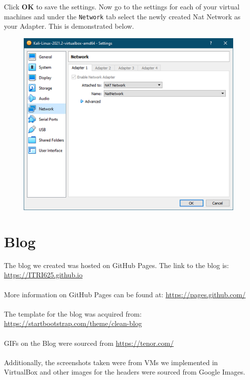 \documentclass[a4paper, 12pt, titlepage]{report}
\begin{document}
Click \textbf{OK} to save the settings. Now go to the settings for each of your virtual machines and under the \texttt{Network} tab select the newly created Nat Network as your Adapter. This is demonstrated below.
\begin{figure}[H]
    \centering
    \includegraphics[scale=1]{pics/net3.png}
\end{figure}
\section{Blog}
The blog we created was hosted on GitHub Pages. The link to the blog is:\\
\url{https://ITRI625.github.io}\\\\
More information on GitHub Pages can be found at: \url{https://pages.github.com/}\\\\
The template for the blog was acquired from:\\
\url{https://startbootstrap.com/theme/clean-blog}\\\\
GIFs on the Blog were sourced from \url{https://tenor.com/}\\\\
Additionally, the screenshots taken were from VMs we implemented in VirtualBox and other images for the headers were sourced from Google Images.
\end{document}
